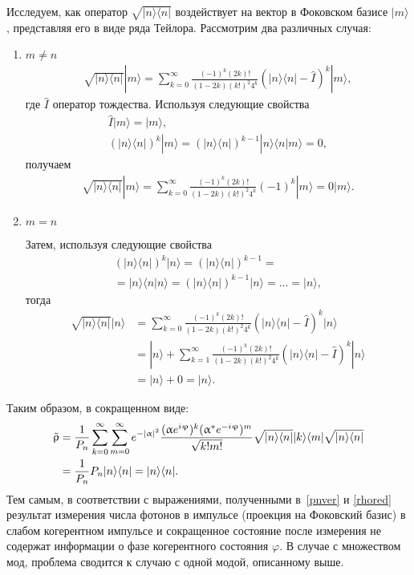 %
Исследуем, как оператор $\sqrt{|n\rangle\langle n|}$ воздействует на вектор в Фоковском базисе $|m\rangle$, представляя его в виде ряда Тейлора. Рассмотрим два различных случая:
%
\begin{enumerate}
    \item $m \neq n$
    \begin{align}
        \sqrt{|n\rangle\langle n|}|m\rangle = \sum_{k=0}^{\infty} \frac{(-1)^k(2k)!}{(1-2k)(k!)^2 4^k}(|n\rangle\langle n|-\hat{I})^k|m\rangle ,
    \end{align}
    где $\hat{I}$ оператор тождества. Используя следующие свойства
    \begin{gather}
        \hat{I}|m\rangle=|m\rangle, \\
        (|n\rangle\langle n|)^k |m\rangle = (|n\rangle\langle n|)^{k-1} |n\rangle\langle n|m\rangle = 0,
    \end{gather}
    получаем
    \begin{align}
       \sqrt{|n\rangle\langle n|}|m\rangle = \sum_{k=0}^{\infty} \frac{(-1)^k(2k)!}{(1-2k)(k!)^2 4^k}(-1)^k|m\rangle = 0 |m\rangle.
    \end{align}
    \item $m=n$
    
   Затем, используя следующие свойства
    \begin{align}
        (|n\rangle\langle n|)^k |n\rangle = (|n\rangle\langle n|)^{k-1}=\nonumber\\ =|n\rangle\langle n|n\rangle = (|n\rangle\langle n|)^{k-1} |n\rangle = ... = |n\rangle,
    \end{align}
    тогда
    \begin{align}
        \sqrt{|n\rangle\langle n|}|n\rangle &= \sum_{k=0}^{\infty} \frac{(-1)^k(2k)!}{(1-2k)(k!)^2 4^k}(|n\rangle\langle n|-\hat{I})^k|n\rangle \nonumber\\
        &=|n\rangle + \sum_{k=1}^{\infty} \frac{(-1)^k(2k)!}{(1-2k)(k!)^2 4^k}(|n\rangle\langle n|-\hat{I})^k|n\rangle \nonumber\\
        &=|n\rangle + 0 = |n\rangle.
    \end{align}
\end{enumerate}
%
Таким образом, в сокращенном виде:
%
\begin{align}
   \Tilde{\rho}&=\frac{1}{P_n}\sum_{k=0}^{\infty}\sum_{m=0}^{\infty} e^{-|\alpha|^2} \frac{(\alpha e^{i \varphi})^k(\alpha^{*} e^{-i \varphi})^m}{\sqrt{k!m!}} \sqrt{|n\rangle\langle n|}|k\rangle\langle m |\sqrt{|n\rangle\langle n|} \nonumber \\
   &= \frac{1}{P_n} P_n |n\rangle\langle n| = |n\rangle\langle n|. \label{rhored}
\end{align}
%
Тем самым, в соответствии с выражениями, полученными в~\ref{pnver} и \ref{rhored} результат измерения числа фотонов в импульсе (проекция на Фоковский базис) в слабом когерентном импульсе и сокращенное состояние после измерения не содержат информации о фазе когерентного состояния $\varphi$. В случае с множеством мод, проблема сводится к случаю с одной модой, описанному выше.
\pagebreak

